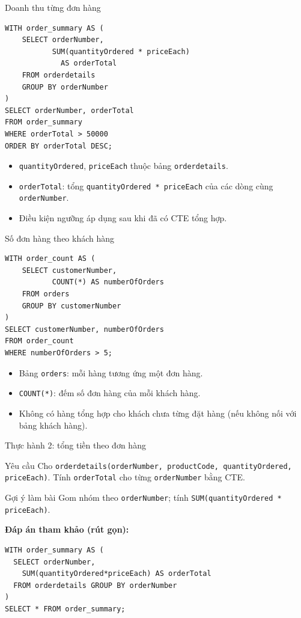 \documentclass[aspectratio=169,10pt]{beamer}
\newcommand{\code}[1]{\texttt{#1}}
\begin{document}
\begin{frame}[fragile]{Doanh thu từng đơn hàng}
\small
\begin{lstlisting}[basicstyle=\ttfamily\scriptsize]
WITH order_summary AS (
    SELECT orderNumber,
           SUM(quantityOrdered * priceEach)
             AS orderTotal
    FROM orderdetails
    GROUP BY orderNumber
)
SELECT orderNumber, orderTotal
FROM order_summary
WHERE orderTotal > 50000
ORDER BY orderTotal DESC;
\end{lstlisting}
\vspace{.1em}
\begin{itemize}
\item \code{quantityOrdered}, \code{priceEach} thuộc bảng \code{orderdetails}.
\item \code{orderTotal}: tổng \code{quantityOrdered * priceEach} của các dòng cùng \code{orderNumber}.
\item Điều kiện ngưỡng áp dụng sau khi đã có CTE tổng hợp.
\end{itemize}
\end{frame}

\begin{frame}[fragile]{Số đơn hàng theo khách hàng}
\small
\begin{lstlisting}[basicstyle=\ttfamily\scriptsize]
WITH order_count AS (
    SELECT customerNumber,
           COUNT(*) AS numberOfOrders
    FROM orders
    GROUP BY customerNumber
)
SELECT customerNumber, numberOfOrders
FROM order_count
WHERE numberOfOrders > 5;
\end{lstlisting}
\vspace{.1em}
\begin{itemize}
\item Bảng \code{orders}: mỗi hàng tương ứng một đơn hàng.
\item \code{COUNT(*)}: đếm số đơn hàng của mỗi khách hàng.
\item Không có hàng tổng hợp cho khách chưa từng đặt hàng (nếu không nối với bảng khách hàng).
\end{itemize}
\end{frame}

\begin{frame}[fragile]{Thực hành 2: tổng tiền theo đơn hàng}
\begin{block}{Yêu cầu}
Cho \code{orderdetails(orderNumber, productCode, quantityOrdered, priceEach)}. Tính \code{orderTotal} cho từng \code{orderNumber} bằng CTE.
\end{block}
\begin{alertblock}{Gợi ý làm bài}
Gom nhóm theo \code{orderNumber}; tính \code{SUM(quantityOrdered * priceEach)}.
\end{alertblock}
\textbf{Đáp án tham khảo (rút gọn):}
\begin{lstlisting}[basicstyle=\ttfamily\scriptsize]
WITH order_summary AS (
  SELECT orderNumber,
    SUM(quantityOrdered*priceEach) AS orderTotal
  FROM orderdetails GROUP BY orderNumber
)
SELECT * FROM order_summary;
\end{lstlisting}
\end{frame}
\end{document}
